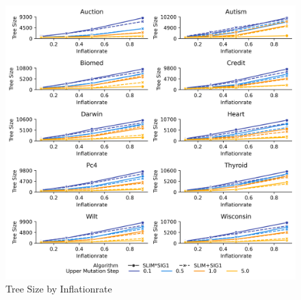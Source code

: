 
    \begin{figure}[h]
    \centering
    \includegraphics[width=\linewidth]{../Latex/Chapters/Figures/Results/inflationrate_tree_size_by_p_inflate.png}
    \caption{Tree Size by Inflationrate}
    \label{fig:tree_size_by_p_inflate}
    \end{figure}
    